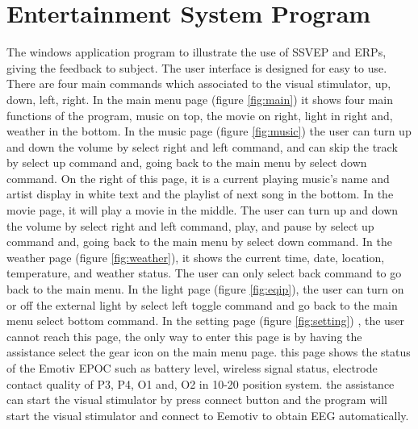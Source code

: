 \section{Entertainment System Program}
\hspace{1.5cm}The windows application program to illustrate the use of SSVEP and ERPs, giving the feedback to subject. The user interface is designed for easy to use. There are four main commands which associated to the visual stimulator, up, down, left, right. In the main menu page (figure \ref{fig:main}) it shows four main functions of the program, music on top, the movie on right, light in right and, weather in the bottom. In the music page (figure \ref{fig:music}) the user can turn up and down the volume by select right and left command, and can skip the track by select up command and, going back to the main menu by select down command. On the right of this page, it is a current playing music's name and artist display in white text and the playlist of next song in the bottom. In the movie page, it will play a movie in the middle. The user can turn up and down the volume by select right and left command, play, and pause by select up command and, going back to the main menu by select down command. In the weather page (figure \ref{fig:weather}), it shows the current time, date, location, temperature, and weather status. The user can only select back command to go back to the main menu. In the light page (figure \ref{fig:eqip}), the user can turn on or off the external light by select left toggle command and go back to the main menu select bottom command. In the setting page (figure \ref{fig:setting}) , the user cannot reach this page, the only way to enter this page is by having the assistance select the gear icon on the main menu page. this page shows the status of the Emotiv EPOC such as battery level, wireless signal status, electrode contact quality of P3, P4, O1 and, O2 in 10-20 position system. the assistance can start the visual stimulator by press connect button and the program will start the visual stimulator and connect to Eemotiv to obtain EEG automatically.




